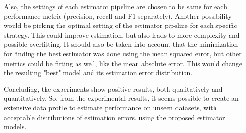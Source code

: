 Also, the settings of each estimator pipeline are chosen to be same for each performance metric (precision, recall and F1 separately). Another possibility would be picking the optimal setting of the estimator pipeline for each specific strategy. This could improve estimation, but also leads to more complexity and possible overfitting. It should also be taken into account that the minimization for finding the best estimator was done using the mean squared error, but other metrics could be fitting as well, like the mean absolute error. This would change the resulting "best" model and its estimation error distribution.

Concluding, the experiments show positive results, both qualitatively and quantitatively. So, from the experimental results, it seems possible to create an extensive data profile to estimate performance on unseen datasets, with acceptable distributions of estimation errors, using the proposed estimator models. 